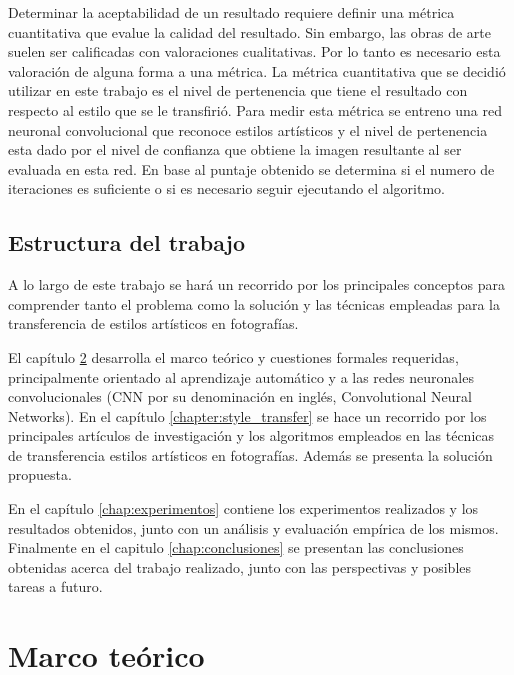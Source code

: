 \documentclass[a4paper,11pt,spanish]{book}
\begin{document}
    Determinar la aceptabilidad de un resultado requiere definir una métrica cuantitativa que evalue la calidad del resultado. 
    Sin embargo, las obras de arte suelen ser calificadas con valoraciones cualitativas. Por lo tanto es necesario esta valoración de alguna forma a una métrica. 
    La métrica cuantitativa que se decidió utilizar en este trabajo es el nivel de pertenencia que tiene el resultado con respecto al estilo que se le transfirió.
    Para medir esta métrica se entreno una red neuronal convolucional que reconoce estilos artísticos y el nivel de pertenencia esta dado por el nivel de confianza que 
    obtiene la imagen resultante al ser evaluada en esta red. 
    En base al puntaje obtenido se determina si el numero de iteraciones es suficiente o si es necesario seguir ejecutando el algoritmo.


  \section {Estructura del trabajo}
    A lo largo de este trabajo se hará un recorrido por los principales conceptos para comprender tanto el problema como la solución y las técnicas empleadas para la 
    transferencia de estilos artísticos en fotografías.

    El capítulo \ref{chap:marco_teorico} desarrolla el marco teórico y cuestiones formales requeridas, principalmente orientado al aprendizaje automático y 
    a las redes neuronales convolucionales (CNN por su denominación en inglés, Convolutional Neural Networks).
    En el capítulo \ref{chapter:style_transfer} se hace un recorrido por los principales artículos de investigación y los algoritmos empleados en las técnicas 
    de transferencia estilos artísticos en fotografías. Además se presenta la solución propuesta.

    En el capítulo \ref{chap:experimentos} contiene los experimentos realizados y los resultados obtenidos, junto con un análisis y evaluación empírica de los mismos. 
    Finalmente en el capitulo \ref{chap:conclusiones} se  presentan las conclusiones obtenidas acerca del trabajo realizado, junto con las perspectivas y posibles tareas a futuro.

\chapter{Marco teórico} \label{chap:marco_teorico}
\end{document}
